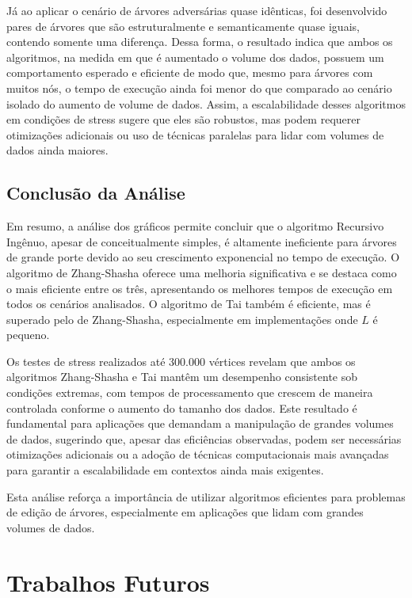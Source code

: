 \documentclass[12pt]{article}
\begin{document}
Já ao aplicar o cenário de árvores adversárias quase idênticas, foi desenvolvido pares de árvores que são estruturalmente e semanticamente quase iguais, contendo somente uma diferença. Dessa forma, o resultado indica que ambos os algoritmos, na medida em que é aumentado o volume dos dados, possuem um comportamento esperado e eficiente de modo que, mesmo para árvores com muitos nós, o tempo de execução ainda foi menor do que comparado ao cenário isolado do aumento de volume de dados. Assim, a escalabilidade desses algoritmos em condições de stress sugere que eles são robustos, mas podem requerer otimizações adicionais ou uso de técnicas paralelas para lidar com volumes de dados ainda maiores.

\subsection{Conclusão da Análise}

Em resumo, a análise dos gráficos permite concluir que o algoritmo Recursivo Ingênuo, apesar de conceitualmente simples, é altamente ineficiente para árvores de grande porte devido ao seu crescimento exponencial no tempo de execução. O algoritmo de Zhang-Shasha oferece uma melhoria significativa e se destaca como o mais eficiente entre os três, apresentando os melhores tempos de execução em todos os cenários analisados. O algoritmo de Tai também é eficiente, mas é superado pelo de Zhang-Shasha, especialmente em implementações onde \(L\) é pequeno.

Os testes de stress realizados até 300.000 vértices revelam que ambos os algoritmos Zhang-Shasha e Tai mantêm um desempenho consistente sob condições extremas, com tempos de processamento que crescem de maneira controlada conforme o aumento do tamanho dos dados. Este resultado é fundamental para aplicações que demandam a manipulação de grandes volumes de dados, sugerindo que, apesar das eficiências observadas, podem ser necessárias otimizações adicionais ou a adoção de técnicas computacionais mais avançadas para garantir a escalabilidade em contextos ainda mais exigentes.

Esta análise reforça a importância de utilizar algoritmos eficientes para problemas de edição de árvores, especialmente em aplicações que lidam com grandes volumes de dados.



\section{Trabalhos Futuros}
\end{document}

